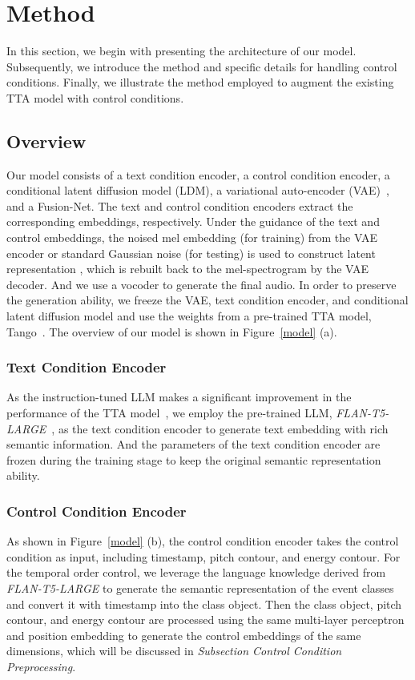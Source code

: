 \documentclass[letterpaper]{article} %
\begin{document}
\section{Method}

In this section, we begin with presenting the architecture of our model. Subsequently, we introduce the method and specific details for handling control conditions. Finally, we illustrate the method employed to augment the existing TTA model with control conditions.

\subsection{Overview}

Our model consists of a text condition encoder, a control condition encoder, a conditional latent diffusion model (LDM), a variational auto-encoder (VAE)~\cite{kingma2013vae}, and a Fusion-Net. The text and control condition encoders extract the corresponding embeddings, respectively. Under the guidance of the text and control embeddings, the noised mel embedding (for training) from the VAE encoder or standard Gaussian noise (for testing) is used to construct latent representation , which is rebuilt back to the mel-spectrogram by the VAE decoder. And we use a vocoder to generate the final audio. In order to preserve the generation ability, we freeze the VAE, text condition encoder, and conditional latent diffusion model and use the weights from a pre-trained TTA model, Tango~\cite{ghosal2023tango}. The overview of our model is shown in Figure~\ref{model} (a).

\subsubsection{Text Condition Encoder} As the instruction-tuned LLM makes a significant improvement in the performance of the TTA model~\cite{ghosal2023tango}, we employ the pre-trained LLM, \textit{FLAN-T5-LARGE}~\cite{chung2022siflm}, as the text condition encoder to generate text embedding with rich semantic information. And the parameters of the text condition encoder are frozen during the training stage to keep the original semantic representation ability.

\subsubsection{Control Condition Encoder} As shown in Figure~\ref{model} (b), the control condition encoder takes the control condition as input, including timestamp, pitch contour, and energy contour. For the temporal order control, we leverage the language knowledge derived from \textit{FLAN-T5-LARGE} to generate the semantic representation of the event classes and convert it with timestamp into the class object. Then the class object, pitch contour, and energy contour are processed using the same multi-layer perceptron and position embedding to generate the control embeddings of the same dimensions, which will be discussed in \textit{Subsection Control Condition Preprocessing}.
\end{document}
